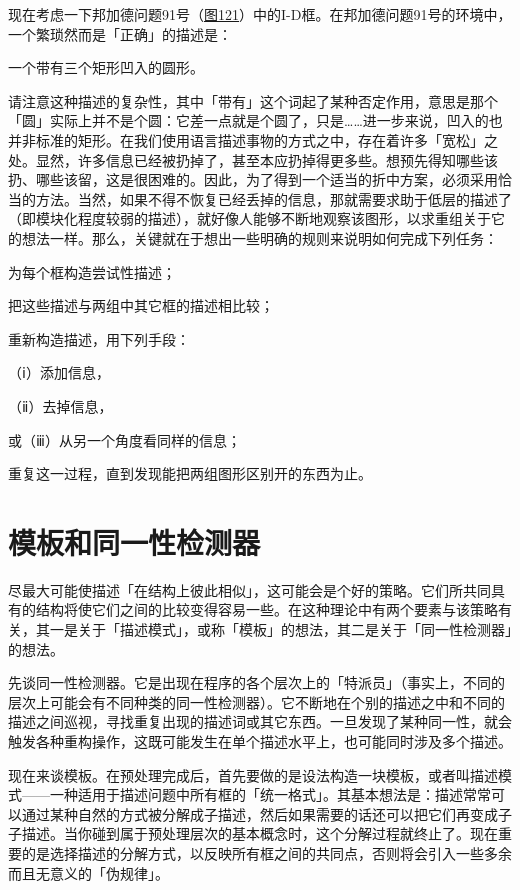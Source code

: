\documentclass[
  12pt,
  twoside,
  openright,
  oldfontcommands,
]{memoir}
\begin{document}
现在考虑一下邦加德问题91号（\hyperref[fig:121]{图121}）中的I-D框。在邦加德问题91号的环境中，一个繁琐然而是「正确」的描述是：

一个带有三个矩形凹入的圆形。

请注意这种描述的复杂性，其中「带有」这个词起了某种否定作用，意思是那个「圆」实际上并不是个圆：它差一点就是个圆了，只是\ldots\ldots 进一步来说，凹入的也并非标准的矩形。在我们使用语言描述事物的方式之中，存在着许多「宽松」之处。显然，许多信息已经被扔掉了，甚至本应扔掉得更多些。想预先得知哪些该扔、哪些该留，这是很困难的。因此，为了得到一个适当的折中方案，必须采用恰当的方法。当然，如果不得不恢复已经丢掉的信息，那就需要求助于低层的描述了（即模块化程度较弱的描述），就好像人能够不断地观察该图形，以求重组关于它的想法一样。那么，关键就在于想出一些明确的规则来说明如何完成下列任务：

为每个框构造尝试性描述；

把这些描述与两组中其它框的描述相比较；

重新构造描述，用下列手段：

（ⅰ）添加信息，

（ⅱ）去掉信息，

或（ⅲ）从另一个角度看同样的信息；

重复这一过程，直到发现能把两组图形区别开的东西为止。

\section{模板和同一性检测器}

尽最大可能使描述「在结构上彼此相似」，这可能会是个好的策略。它们所共同具有的结构将使它们之间的比较变得容易一些。在这种理论中有两个要素与该策略有关，其一是关于「描述模式」，或称「模板」的想法，其二是关于「同一性检测器」的想法。

先谈同一性检测器。它是出现在程序的各个层次上的「特派员」（事实上，不同的层次上可能会有不同种类的同一性检测器）。它不断地在个别的描述之中和不同的描述之间巡视，寻找重复出现的描述词或其它东西。一旦发现了某种同一性，就会触发各种重构操作，这既可能发生在单个描述水平上，也可能同时涉及多个描述。

现在来谈模板。在预处理完成后，首先要做的是设法构造一块模板，或者叫描述模式------一种适用于描述问题中所有框的「统一格式」。其基本想法是：描述常常可以通过某种自然的方式被分解成子描述，然后如果需要的话还可以把它们再变成子子描述。当你碰到属于预处理层次的基本概念时，这个分解过程就终止了。现在重要的是选择描述的分解方式，以反映所有框之间的共同点，否则将会引入一些多余而且无意义的「伪规律」。
\end{document}
